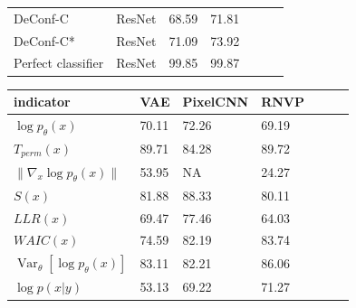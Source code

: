 \documentclass[letterpaper]{article} %
\begin{document}
\begin{table}[t]
\begin{tabular}{lllllll}
DeConf-C & ResNet & 68.59 & 71.81 \\
DeConf-C* & ResNet & 71.09 & 73.92 \\
Perfect classifier & ResNet & 99.85 & 99.87 \\
\bottomrule
\bottomrule
\end{tabular}
\centering
\begin{tabular}{lllllll}
indicator     & VAE & PixelCNN & RNVP  \\
\toprule
$\log p_\theta(x)$ & 70.11 & 72.26 & 69.19 \\
$T_{perm}(x)$ & 89.71 & 84.28 & 89.72 \\
$\|\nabla_x \log p_\theta(x)\|$ & 53.95 & NA & 24.27 \\
$S(x)$ & 81.88 & 88.33 & 80.11\\
$LLR(x)$ & 69.47 & 77.46 & 64.03\\
$WAIC(x)$ & 74.59 & 82.19 & 83.74 \\
$\mathop{Var}_\theta [\log p_\theta(x)]$ & 83.11 & 82.21 & 86.06 \\
$\log p(x|y)$ & 53.13 & 69.22 & 71.27\\

\end{tabular}
\end{table}
\end{document}
